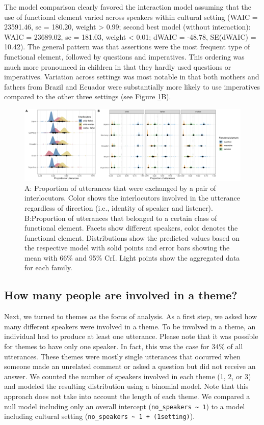 \documentclass[
  man,floatsintext]{apa6}
\begin{document}
The model comparison clearly favored the interaction model assuming that the use of functional element varied across speakers within cultural setting (WAIC = 23591.46, se = 180.20, weight \textgreater{} 0.99; second best model (without interaction): WAIC = 23689.02, se = 181.03, weight \textless{} 0.01; dWAIC = -48.78, SE(dWAIC) = 10.42). The general pattern was that assertions were the most frequent type of functional element, followed by questions and imperatives. This ordering was much more pronounced in children in that they hardly used questions or imperatives. Variation across settings was most notable in that both mothers and fathers from Brazil and Ecuador were substantially more likely to use imperatives compared to the other three settings (see Figure \ref{fig:fig2}B).

\begin{figure}
\includegraphics[width=1\linewidth]{../visuals/fig2} \caption{A: Proportion of utterances that were exchanged by a pair of interlocutors. Color shows the interlocutors involved in the utterance regardless of direction (i.e., identity of speaker and listener). B:Proportion of utterances that belonged to a certain class of functional element. Facets show different speakers, color denotes the functional element. Distributions show the predicted values based on the respective model with solid points and error bars showing the mean with 66\% and 95\% CrI. Light points show the aggregated data for each family.}\label{fig:fig2}
\end{figure}

\hypertarget{how-many-people-are-involved-in-a-theme}{%
\subsection{How many people are involved in a theme?}\label{how-many-people-are-involved-in-a-theme}}

Next, we turned to themes as the focus of analysis. As a first step, we asked how many different speakers were involved in a theme. To be involved in a theme, an individual had to produce at least one utterance. Please note that it was possible for themes to have only one speaker. In fact, this was the case for 34\% of all utterances. These themes were mostly single utterances that occurred when someone made an unrelated comment or asked a question but did not receive an answer. We counted the number of speakers involved in each theme (1, 2, or 3) and modeled the resulting distribution using a binomial model. Note that this approach does not take into account the length of each theme. We compared a null model including only an overall intercept (\texttt{no\_speakers\ \textasciitilde{}\ 1}) to a model including cultural setting (\texttt{no\_speakers\ \textasciitilde{}\ 1\ +\ (1\textbar{}setting)}).
\end{document}
